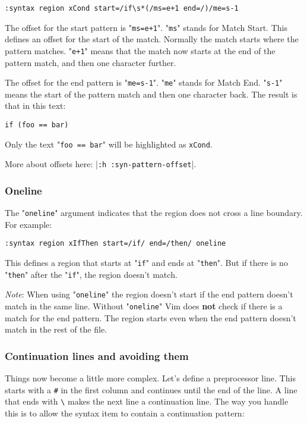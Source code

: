 \begin{Verbatim}[samepage=true]
 :syntax region xCond start=/if\s*(/ms=e+1 end=/)/me=s-1
\end{Verbatim}

The offset for the start pattern is "\texttt{ms=e+1}".
"\texttt{ms}" stands for Match Start.
This defines an offset for the start of the match.
Normally the match starts where the pattern matches.
"\texttt{e+1}" means that the match now starts at the end of the pattern match, and then one character further.

The offset for the end pattern is "\texttt{me=s-1}".
"\texttt{me}" stands for Match End.
"\texttt{s-1}" means the start of the pattern match and then one character back.
The result is that in this text:

\begin{Verbatim}[samepage=true]
    if (foo == bar) 
\end{Verbatim}

Only the text "\texttt{foo == bar}" will be highlighted as \texttt{xCond}.

More about offsets here: |\texttt{:h :syn-pattern-offset}|.
\subsubsection{Oneline}
The "\texttt{oneline}" argument indicates that the region does not cross a line boundary.
For example:

\begin{Verbatim}[samepage=true]
 :syntax region xIfThen start=/if/ end=/then/ oneline
\end{Verbatim}

This defines a region that starts at "\texttt{if}" and ends at "\texttt{then}".
But if there is no "\texttt{then}" after the "\texttt{if}", the region doesn't match.

\emph{Note}: When using "\texttt{oneline}" the region doesn't start if the end pattern doesn't match in the same line.
Without "\texttt{oneline}" Vim does \textbf{not} check if there is a match for the end pattern.
The region starts even when the end pattern doesn't match in the rest of the file.

\subsubsection{Continuation lines and avoiding them}
Things now become a little more complex.
Let's define a preprocessor line.
This starts with a \texttt{\#} in the first column and continues until the end of the line.
A line that ends with \texttt{\textbackslash{}} makes the next line a continuation line.
The way you handle this is to allow the syntax item to contain a continuation pattern:

